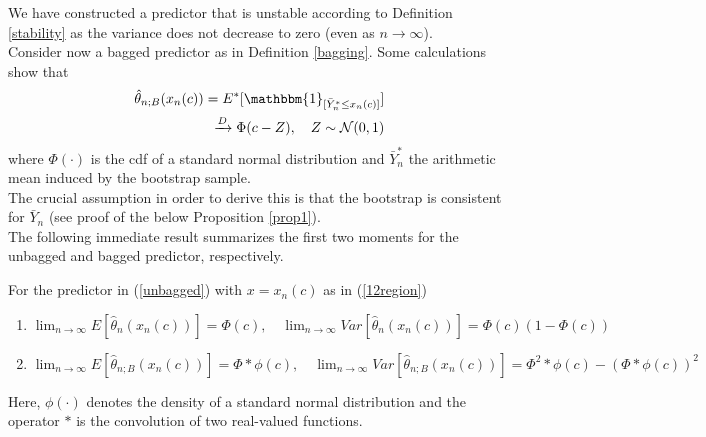 We have constructed a predictor that is unstable according to Definition \ref{stability} as the variance does not decrease to zero (even as $n \rightarrow \infty$).\\
Consider now a bagged predictor as in Definition \ref{bagging}. Some calculations show that
\begin{equation}\label{bagged}
\begin{split}
\hat{\theta}_{n;B}(x_{n}(c))=E^{*}[\mathbbm{1}_{[\bar{Y}_{n}^{*} \leq x_{n}(c)]}]\\
\xrightarrow{D} \Phi(c-Z), \quad Z \sim \mathcal{N}(0,1)
\end{split}
\end{equation}
where $\Phi(\cdot)$ is the cdf of a standard normal distribution and $\bar{Y}_{n}^{*}$ the arithmetic mean induced by the bootstrap sample.\\
The crucial assumption in order to derive this is that the bootstrap is consistent for $\bar{Y}_n$ (see proof of the below Proposition \ref{prop1}).\\
The following immediate result summarizes the first two moments for the unbagged and bagged predictor, respectively.

\begin{corollary}\label{corimpl}
For the predictor in (\ref{unbagged}) with $x = 	x_{n}(c)$ as in (\ref{12region})

	\begin{enumerate}
	\item \label{assertioncor1}
$\lim_{n \rightarrow \infty}E[\hat{\theta}_{n}(x_{n}(c))]=\Phi(c),\quad
\lim_{n \rightarrow \infty}Var[\hat{\theta}_{n}(x_{n}(c))]=\Phi(c)(1-\Phi(c))$

	\item \label{assertioncor2}
$\lim_{n \rightarrow \infty}E[\hat{\theta}_{n;B}(x_{n}(c))]=\Phi*\phi(c),\quad
\lim_{n \rightarrow \infty}Var[\hat{\theta}_{n;B}(x_{n}(c))]=\Phi^{2}*\phi(c)-(\Phi*\phi(c))^{2}$
	\end{enumerate}
Here, $\phi(\cdot)$ denotes the density of a standard normal distribution and the operator $*$ is the convolution of two real-valued functions.
\end{corollary}

